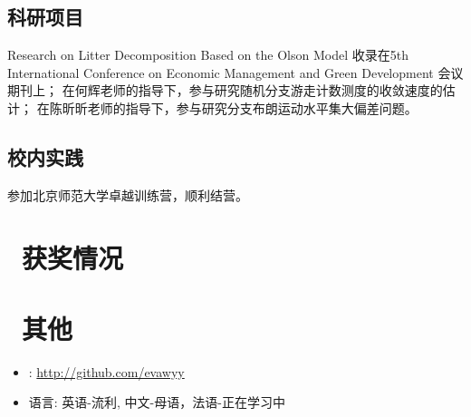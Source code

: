 \documentclass{resume}
\begin{document}
\subsection{科研项目}
Research on Litter Decomposition Based on the Olson Model 收录在5th International Conference on Economic Management and Green Development
会议期刊上；
在何辉老师的指导下，参与研究随机分支游走计数测度的收敛速度的估计；
在陈昕昕老师的指导下，参与研究分支布朗运动水平集大偏差问题。
\subsection{校内实践}
参加北京师范大学卓越训练营，顺利结营。

%

\section{\faHeartO\ 获奖情况}

\section{\faInfo\ 其他}
\begin{itemize}[parsep=0.5ex]
  \item \faGithub: \href{http://github.com/evawyy}{http://github.com/evawyy}
  \item 语言: 英语-流利, 中文-母语，法语-正在学习中
\end{itemize}

%
%
\end{document}
